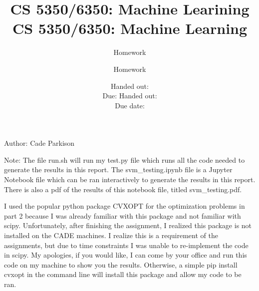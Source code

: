 \documentclass[12pt, fullpage,letterpaper]{article}
\title{CS 5350/6350: Machine Learining \semester}
\author{Homework \assignmentId}
\date{Handed out: \releaseDate\\
	Due: \dueDate}
\title{CS 5350/6350: Machine Learning \semester}
\author{Homework \assignmentId}
\date{Handed out: \releaseDate\\
  Due date: \dueDate}
\begin{document}
\maketitle


\newcommand{\Hcal}{\mathcal{H}} 
{\footnotesize

	Author: Cade Parkison
	
	Note:
	The file run.sh will run my test.py file which runs all the code needed to generate the results in this report. The svm\_testing.ipynb file is a Jupyter Notebook file which can be ran interactively to generate the results in this report. There is also a pdf of the results of this notebook file, titled svm\_testing.pdf.
	
	I used the popular python package CVXOPT for the optimization problems in part 2 because I was already familiar with this package and not familiar with scipy.
Unfortunately, after finishing the assignment, I realized this package is not installed on the CADE machines.
I realize this is a requirement of the assignments, but due to time constraints I was unable to re-implement the code in scipy.
My apologies, if you would like, I can come by your office and run this code on my machine to show you the results.
Otherwise, a simple pip install cvxopt in the command line will install this package and allow my code to be ran.

}


	
\end{document}
